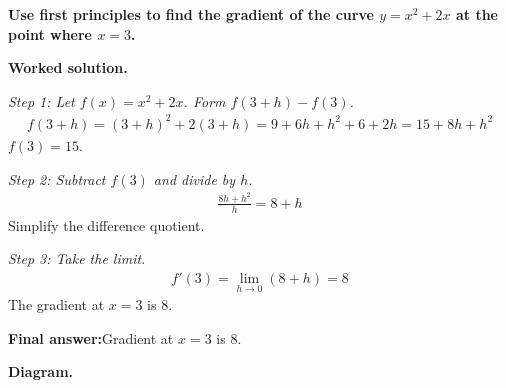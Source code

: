 \documentclass[11pt]{article}
\newcommand{\question}[1]{\par\medskip\noindent\textbf{#1}\par}
\begin{document}
\question{Use first principles to find the gradient of the curve \( y = x^2 + 2x \) at the point where \( x = 3 \).}

\textbf{Worked solution.}

\textit{Step 1: Let \( f(x) = x^2 + 2x \). Form \( f(3+h) - f(3) \).}
\[\begin{gathered}
f(3+h) = (3+h)^2 + 2(3+h) = 9 + 6h + h^2 + 6 + 2h = 15 + 8h + h^2
\end{gathered}\]
\( f(3) = 15 \).

\textit{Step 2: Subtract \( f(3) \) and divide by \( h \).}
\[\begin{gathered}
\frac{8h + h^2}{h} = 8 + h
\end{gathered}\]
Simplify the difference quotient.

\textit{Step 3: Take the limit.}
\[\begin{gathered}
f'(3) = \lim_{h \to 0}(8 + h) = 8
\end{gathered}\]
The gradient at \( x = 3 \) is 8.

\begin{answerbox}
\textbf{Final answer:}\quad Gradient at \(\displaystyle  x = 3 \) is 8.
\end{answerbox}
\textbf{Diagram.}
\end{document}
